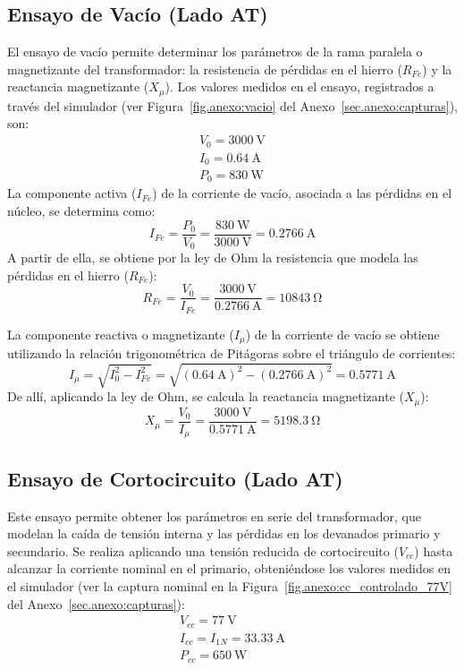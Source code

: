 \subsection{Ensayo de Vacío (Lado AT)}
El ensayo de vacío permite determinar los parámetros de la rama paralela o magnetizante del transformador: la
resistencia de pérdidas en el hierro ($R_{Fe}$) y la reactancia magnetizante ($X_\mu$). Los valores medidos en el ensayo, registrados a través del simulador (ver Figura~\ref{fig.anexo:vacio} del Anexo~\ref{sec.anexo:capturas}), son:
\begin{gather*}
    V_0 = \SI{3000}{\volt} \\
    I_0 = \SI{0,64}{\ampere} \\
    P_0 = \SI{830}{\watt}
\end{gather*}
La componente activa ($I_{Fe}$) de la corriente de vacío, asociada a las pérdidas en el núcleo, se determina como:
\begin{equation*}
    I_{Fe} = \frac{P_0}{V_0} = \frac{\SI{830}{\watt}}{\SI{3000}{\volt}} = \SI{0,2766}{\ampere}
\end{equation*}
A partir de ella, se obtiene por la ley de Ohm la resistencia que modela las pérdidas en el hierro ($R_{Fe}$):
\begin{equation*}
    R_{Fe} = \frac{V_0}{I_{Fe}} = \frac{\SI{3000}{\volt}}{\SI{0,2766}{\ampere}} = \SI{10843}{\ohm}
\end{equation*}

La componente reactiva o magnetizante ($I_\mu$) de la corriente de vacío se obtiene utilizando la relación trigonométrica
de Pitágoras sobre el triángulo de corrientes:
\begin{equation*}
    I_\mu = \sqrt{I_0^2 - I_{Fe}^2} = \sqrt{(\SI{0,64}{\ampere})^2 - (\SI{0,2766}{\ampere})^2} = \SI{0,5771}{\ampere}
\end{equation*}
De allí, aplicando la ley de Ohm, se calcula la reactancia magnetizante ($X_\mu$):
\begin{equation*}
    X_\mu = \frac{V_0}{I_\mu} = \frac{\SI{3000}{\volt}}{\SI{0,5771}{\ampere}} = \SI{5198,3}{\ohm}
\end{equation*}

\subsection{Ensayo de Cortocircuito (Lado AT)}
Este ensayo permite obtener los parámetros en serie del transformador, que modelan la caída de tensión interna y las
pérdidas en los devanados primario y secundario. Se realiza aplicando una tensión reducida de cortocircuito ($V_{cc}$)
hasta alcanzar la corriente nominal en el primario, obteniéndose los valores medidos en el simulador (ver la captura nominal en la Figura~\ref{fig.anexo:cc_controlado_77V} del Anexo~\ref{sec.anexo:capturas}):
\begin{gather*}
    V_{cc} = \SI{77}{\volt} \\
    I_{cc} = I_{1N} = \SI{33,33}{\ampere} \\
    P_{cc} = \SI{650}{\watt}
\end{gather*}

